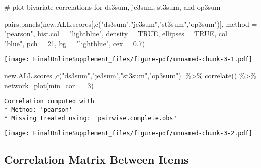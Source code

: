 \documentclass[
  letterpaper,
  DIV=11,
  numbers=noendperiod]{scrartcl}
\newenvironment{Shaded}{\begin{snugshade}}{\end{snugshade}}
\newcommand{\AttributeTok}[1]{\textcolor[rgb]{0.40,0.45,0.13}{#1}}
\newcommand{\CommentTok}[1]{\textcolor[rgb]{0.37,0.37,0.37}{#1}}
\newcommand{\ConstantTok}[1]{\textcolor[rgb]{0.56,0.35,0.01}{#1}}
\newcommand{\DecValTok}[1]{\textcolor[rgb]{0.68,0.00,0.00}{#1}}
\newcommand{\FloatTok}[1]{\textcolor[rgb]{0.68,0.00,0.00}{#1}}
\newcommand{\FunctionTok}[1]{\textcolor[rgb]{0.28,0.35,0.67}{#1}}
\newcommand{\NormalTok}[1]{\textcolor[rgb]{0.00,0.23,0.31}{#1}}
\newcommand{\SpecialCharTok}[1]{\textcolor[rgb]{0.37,0.37,0.37}{#1}}
\newcommand{\StringTok}[1]{\textcolor[rgb]{0.13,0.47,0.30}{#1}}
\begin{document}
\begin{Shaded}
\begin{Highlighting}[]
\CommentTok{\# plot bivariate correlations for ds3sum, je3sum, st3sum, and op3sum}

\FunctionTok{pairs.panels}\NormalTok{(new.ALL.scores[,}\FunctionTok{c}\NormalTok{(}\StringTok{"ds3sum"}\NormalTok{,}\StringTok{"je3sum"}\NormalTok{,}\StringTok{"st3sum"}\NormalTok{,}\StringTok{"op3sum"}\NormalTok{)], }
             \AttributeTok{method =} \StringTok{"pearson"}\NormalTok{, }
             \AttributeTok{hist.col =} \StringTok{"lightblue"}\NormalTok{, }
             \AttributeTok{density =} \ConstantTok{TRUE}\NormalTok{, }
             \AttributeTok{ellipses =} \ConstantTok{TRUE}\NormalTok{, }
             \AttributeTok{col =} \StringTok{"blue"}\NormalTok{, }
             \AttributeTok{pch =} \DecValTok{21}\NormalTok{, }
             \AttributeTok{bg =} \StringTok{"lightblue"}\NormalTok{, }
             \AttributeTok{cex =} \FloatTok{0.7}\NormalTok{)}
\end{Highlighting}
\end{Shaded}

\texttt{[image: FinalOnlineSupplement\_files/figure-pdf/unnamed-chunk-3-1.pdf]}

\begin{Shaded}
\begin{Highlighting}[]
\NormalTok{new.ALL.scores[,}\FunctionTok{c}\NormalTok{(}\StringTok{"ds3sum"}\NormalTok{,}\StringTok{"je3sum"}\NormalTok{,}\StringTok{"st3sum"}\NormalTok{,}\StringTok{"op3sum"}\NormalTok{)] }\SpecialCharTok{\%\textgreater{}\%} 
  \FunctionTok{correlate}\NormalTok{() }\SpecialCharTok{\%\textgreater{}\%}
  \FunctionTok{network\_plot}\NormalTok{(}\AttributeTok{min\_cor =}\NormalTok{ .}\DecValTok{3}\NormalTok{)}
\end{Highlighting}
\end{Shaded}

\begin{verbatim}
Correlation computed with
* Method: 'pearson'
* Missing treated using: 'pairwise.complete.obs'
\end{verbatim}

\texttt{[image: FinalOnlineSupplement\_files/figure-pdf/unnamed-chunk-3-2.pdf]}

\subsection{Correlation Matrix Between
Items}\label{correlation-matrix-between-items}
\end{document}
